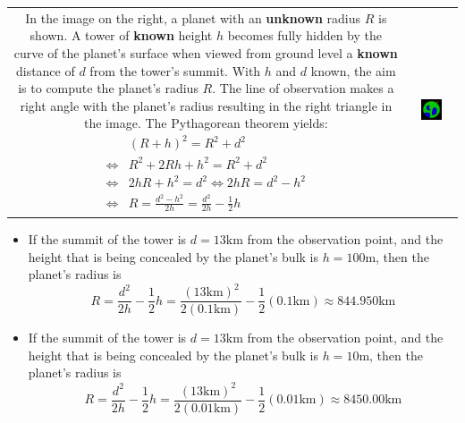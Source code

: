 \documentclass{article}
\begin{document}
\begin{tabular}{cc}
\parbox{0.5\textwidth}{
In the image on the right, a planet with an {\bf unknown} radius \(R\) is shown. A tower of {\bf known} height \(h\) becomes fully hidden by the curve of the planet's surface when viewed from ground level a {\bf known} distance of \(d\) from the tower's summit. With \(h\) and \(d\) known, the aim is to compute the planet's radius \(R\). The line of observation makes a right angle with the planet's radius resulting in the right triangle in the image. The Pythagorean theorem yields:
\begin{align*}
& (R + h)^2 = R^2 + d^2 \\
\iff & R^2 + 2Rh + h^2 = R^2 + d^2 \\
\iff & 2hR + h^2 = d^2 
\iff 2hR = d^2 - h^2 \\
\iff & R = \frac{d^2 - h^2}{2h} = \frac{d^2}{2h} - \frac{1}{2}h
\end{align*}
} & \parbox{0.5\textwidth}{
\includegraphics[width = 0.5\textwidth]{radius_of_a_planet}
}
\end{tabular}
\begin{itemize}
\item If the summit of the tower is \(d = 13\text{km}\) from the observation point, and the height that is being concealed by the planet's bulk is \(h = 100\text{m}\), then the planet's radius is 
\[R = \frac{d^2}{2h} - \frac{1}{2}h = \frac{(13\text{km})^2}{2(0.1\text{km})} - \frac{1}{2}(0.1\text{km}) \approx 844.950\text{km}\]
\item If the summit of the tower is \(d = 13\text{km}\) from the observation point, and the height that is being concealed by the planet's bulk is \(h = 10\text{m}\), then the planet's radius is 
\[R = \frac{d^2}{2h} - \frac{1}{2}h = \frac{(13\text{km})^2}{2(0.01\text{km})} - \frac{1}{2}(0.01\text{km}) \approx 8450.00\text{km}\]
\end{itemize}
\end{document}
